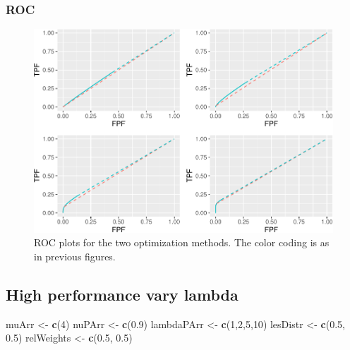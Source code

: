 \documentclass[
]{book}
\newenvironment{Shaded}{\begin{snugshade}}{\end{snugshade}}
\newcommand{\DecValTok}[1]{\textcolor[rgb]{0.00,0.00,0.81}{#1}}
\newcommand{\FloatTok}[1]{\textcolor[rgb]{0.00,0.00,0.81}{#1}}
\newcommand{\KeywordTok}[1]{\textcolor[rgb]{0.13,0.29,0.53}{\textbf{#1}}}
\newcommand{\NormalTok}[1]{#1}
\newcommand{\StringTok}[1]{\textcolor[rgb]{0.31,0.60,0.02}{#1}}
\begin{document}
\hypertarget{roc-6}{%
\subsubsection{ROC}\label{roc-6}}

\begin{figure}
\centering
\includegraphics{22-optim-op-point_files/figure-latex/optim-op-point-low-performance-vary-mu-vary-all-roc-1.pdf}
\caption{\label{fig:optim-op-point-low-performance-vary-mu-vary-all-roc}ROC plots for the two optimization methods. The color coding is as in previous figures.}
\end{figure}

\hypertarget{optim-op-point-high-performance-vary-lambda}{%
\subsection{High performance vary lambda}\label{optim-op-point-high-performance-vary-lambda}}

\begin{Shaded}
\begin{Highlighting}[]
\NormalTok{muArr <-}\StringTok{ }\KeywordTok{c}\NormalTok{(}\DecValTok{4}\NormalTok{)}
\NormalTok{nuPArr <-}\StringTok{ }\KeywordTok{c}\NormalTok{(}\FloatTok{0.9}\NormalTok{)}
\NormalTok{lambdaPArr <-}\StringTok{ }\KeywordTok{c}\NormalTok{(}\DecValTok{1}\NormalTok{,}\DecValTok{2}\NormalTok{,}\DecValTok{5}\NormalTok{,}\DecValTok{10}\NormalTok{)}
\NormalTok{lesDistr <-}\StringTok{ }\KeywordTok{c}\NormalTok{(}\FloatTok{0.5}\NormalTok{, }\FloatTok{0.5}\NormalTok{)}
\NormalTok{relWeights <-}\StringTok{ }\KeywordTok{c}\NormalTok{(}\FloatTok{0.5}\NormalTok{, }\FloatTok{0.5}\NormalTok{)}
\end{Highlighting}
\end{Shaded}
\end{document}
